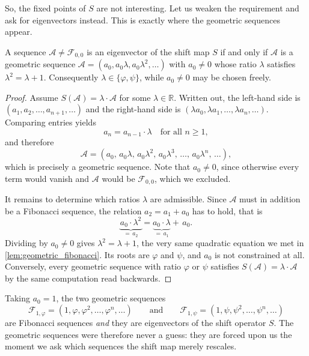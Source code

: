 So, the fixed points of $S$ are not interesting. Let us weaken the requirement and ask
for eigenvectors instead. This is exactly where the geometric sequences appear.

\begin{proposition}
\label{prop:eigenvectors_shift}
A sequence $\mathcal{A} \ne \mathcal{F}_{0,0}$ is an eigenvector of the shift map $S$
if and only if $\mathcal{A}$ is a geometric sequence
$\mathcal{A} = (a_0, a_0 \lambda, a_0 \lambda^2, \dots)$ with $a_0 \ne 0$ whose ratio
$\lambda$ satisfies $\lambda^2 = \lambda + 1$. Consequently
$\lambda \in \{\varphi, \psi\}$, while $a_0 \ne 0$ may be chosen freely.
\end{proposition}

\begin{proof}
Assume $S(\mathcal{A}) = \lambda \cdot \mathcal{A}$ for some $\lambda \in \mathbb{R}$.
Written out, the left-hand side is $(a_1, a_2, \dots, a_{n+1}, \dots)$ and the
right-hand side is $(\lambda a_0, \lambda a_1, \dots, \lambda a_n, \dots)$. Comparing
entries yields
\[
a_n = a_{n-1} \cdot \lambda \quad \text{for all } n \ge 1,
\]
and therefore
\[
\mathcal{A} = (a_0, \, a_0 \lambda, \, a_0 \lambda^2, \, a_0 \lambda^3, \, \dots, \, a_0 \lambda^n, \, \dots),
\]
which is precisely a geometric sequence. Note that $a_0 \ne 0$, since otherwise every
term would vanish and $\mathcal{A}$ would be $\mathcal{F}_{0,0}$, which we excluded.

It remains to determine which ratios $\lambda$ are admissible. Since $\mathcal{A}$ must
in addition be a Fibonacci sequence, the relation $a_2 = a_1 + a_0$ has to hold, that is
\[
\underbrace{a_0 \cdot \lambda^2}_{=\, a_2} = \underbrace{a_0 \cdot \lambda}_{=\, a_1} + \, a_0 .
\]
Dividing by $a_0 \ne 0$ gives $\lambda^2 = \lambda + 1$, the very same quadratic
equation we met in \cref{lem:geometric_fibonacci}. Its roots are $\varphi$ and $\psi$,
and $a_0$ is not constrained at all. Conversely, every geometric sequence with ratio
$\varphi$ or $\psi$ satisfies $S(\mathcal{A}) = \lambda \cdot \mathcal{A}$ by the same
computation read backwards.
\end{proof}

\begin{conclusion}
Taking $a_0 = 1$, the two geometric sequences
\[
\mathcal{F}_{1, \varphi} = (1, \varphi, \varphi^2, \dots, \varphi^n, \dots)
\qquad \text{and} \qquad
\mathcal{F}_{1, \psi} = (1, \psi, \psi^2, \dots, \psi^n, \dots)
\]
are Fibonacci sequences \textit{and} they are eigenvectors of the shift operator $S$.
The geometric sequences were therefore never a guess: they are forced upon us the
moment we ask which sequences the shift map merely rescales.
\end{conclusion}

